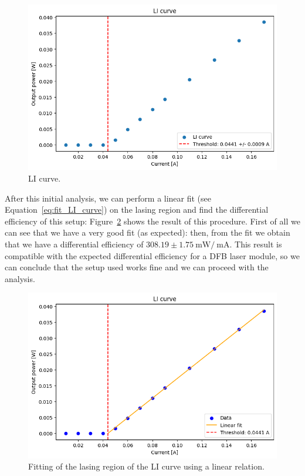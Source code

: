 \documentclass[prl,twocolumn]{revtex4-1}
\begin{document}
\begin{figure}[!t]
    \centering
    \includegraphics[width=\linewidth]{Images/LI_curve.png}
    \caption{LI curve.}
    \label{fig:LI_curve}
\end{figure}

After this initial analysis, we can perform a linear fit (see Equation~\eqref{eq:fit_LI_curve}) on the lasing region and find the differential efficiency of this setup: Figure~\ref{fig:LI_curve_fit} shows the result of this procedure. First of all we can see that we have a very good fit (as expected): then, from the fit we obtain that we have a differential efficiency of $308.19 \pm 1.75 \SI{}{\milli\watt}/\SI{}{\milli\ampere}$. This result is compatible with the expected differential efficiency for a DFB laser module, so we can conclude that the setup used works fine and we can proceed with the analysis. 

\begin{figure}[!b]
    \centering
    \includegraphics[width=\linewidth]{Images/LI_curve_fit.png}
    \caption{Fitting of the lasing region of the LI curve using a linear relation.}
    \label{fig:LI_curve_fit}
\end{figure}
\end{document}
